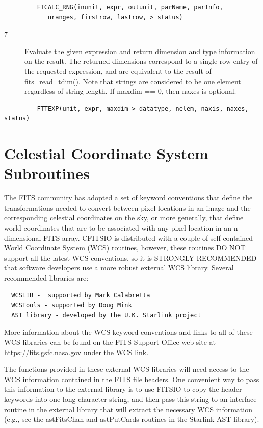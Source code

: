 \documentclass[11pt]{book}
\begin{document}
\begin{verbatim}
         FTCALC_RNG(inunit, expr, outunit, parName, parInfo,
            nranges, firstrow, lastrow, > status)
\end{verbatim}

\begin{description}
\item[7 ]Evaluate the given expression and return dimension and type information
on the result.  The returned dimensions correspond to a single row entry
of the requested expression, and are equivalent to the result of fits\_read\_tdim().
Note that strings are considered to be one element regardless of string length.
If maxdim == 0, then naxes is optional.
\end{description}

\begin{verbatim}
         FTTEXP(unit, expr, maxdim > datatype, nelem, naxis, naxes, status)
\end{verbatim}



\section{Celestial Coordinate System Subroutines \label{FTGICS}}

The FITS community has adopted a set of keyword conventions that define
the transformations needed to convert between pixel locations in an
image and the corresponding celestial coordinates on the sky, or more
generally, that define world coordinates that are to be associated with
any pixel location in an n-dimensional FITS array. CFITSIO is distributed
with a couple of self-contained World Coordinate System (WCS) routines,
however, these routines DO NOT support all the latest WCS conventions,
so it is STRONGLY RECOMMENDED that software developers use a more robust
external WCS library.  Several recommended libraries are:

\begin{verbatim}
  WCSLIB -  supported by Mark Calabretta
  WCSTools - supported by Doug Mink
  AST library - developed by the U.K. Starlink project
\end{verbatim}

More information about the WCS keyword conventions and links to all of
these WCS libraries can be found on the FITS Support Office web site at
https://fits.gsfc.nasa.gov under the WCS link.

The functions provided in these external WCS libraries will need access to
the  WCS information contained in the FITS file headers.  One convenient
way to pass this information to the external library is to use  FITSIO
to copy the header keywords into one long character string, and then
pass this string to an interface routine in the external library that
will extract the necessary WCS information (e.g., see the astFitsChan
and astPutCards routines in the Starlink AST library).
\end{document}
